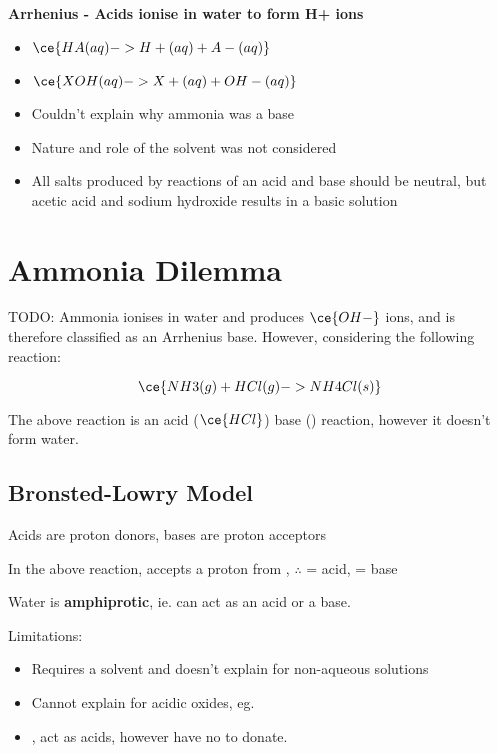	\textbf{Arrhenius - Acids ionise in water to form H+ ions}
	\begin{itemize}
		\item $\ce{HA(aq) -> H+(aq) + A-(aq)}$
		\item $\ce{XOH(aq) -> X+(aq) + OH-(aq)}$
		\item Couldn't explain why ammonia was a base
		\item Nature and role of the solvent was not considered
		\item All salts produced by reactions of an acid and base should be neutral, but acetic acid and sodium hydroxide results in a basic solution
	\end{itemize}

\section{Ammonia Dilemma} \label{12/02/2025} TODO:
	Ammonia ionises in water and produces $\ce{OH-}$ ions, and is therefore classified as an Arrhenius base. However, considering the following reaction:

	$$\ce{NH3(g) + HCl(g) -> NH4Cl(s)}$$

	The above reaction is an acid ($\ce{HCl}$) base () reaction, however it doesn't form water.

	\subsection{Bronsted-Lowry Model}
 		Acids are proton donors, bases are proton acceptors
		\bgroup
			\centering
		\egroup

		In the above reaction,  accepts a proton from , $\therefore$  = acid,  = base

		\bgroup
			\centering
		\egroup

		Water is \textbf{amphiprotic}, ie. can act as an acid or a base.

		\bgroup
			\centering
		\egroup

		Limitations:
		\begin{itemize}
			\item Requires a solvent and doesn't explain for non-aqueous solutions
			\item Cannot explain for acidic oxides, eg. 
			\item {},  act as acids, however have no  to donate.
		\end{itemize}

